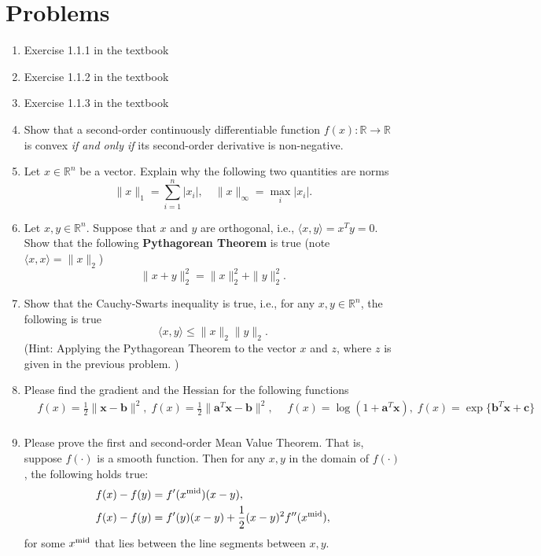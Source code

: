 \documentclass[11pt,letterpaper]{article}
\newcommand{\bb}{\mathbf{b}}
\newcommand{\bx}{\mathbf{x}}
\begin{document}
\section{Problems}

\begin{enumerate}
\item Exercise 1.1.1 in the textbook
\item Exercise 1.1.2 in the textbook
\item Exercise 1.1.3 in the textbook
\item Show that a second-order continuously differentiable function $f(x):\mathbb{R}\to \mathbb{R}$ is convex {\it if and only if} its second-order derivative is non-negative.

	  \item Let $x\in\mathbb{R}^n$ be a vector. Explain why the following two quantities are norms
	  $$\|x\|_1=\sum_{i=1}^{n}|x_i|,\quad \|x\|_{\infty} = \max_{i}|x_i|.$$
	  
	   \item Let $x, y\in\mathbb{R}^n$. Suppose that $x$ and $y$ are orthogonal, i.e., $\langle x, y\rangle = x^T y = 0$. Show that the following {\bf Pythagorean Theorem} is true (note $\langle x, x\rangle = \|x\|_2$)
	   $$\|x+y\|_2^2 = \|x\|_2^2+\|y\|_2^2.$$
	   
	   
	   \item Show that the Cauchy-Swarts inequality is true, i.e., for any $x,y\in\mathbb{R}^n$, the following is true
	   $$\langle x, y\rangle\le \|x\|_2\|y\|_2.$$
	   (Hint: Applying the Pythagorean Theorem to the vector $x$ and $z$, where $z$ is given in the previous problem. )
	   
	  
	    \item Please find the gradient and the Hessian for the following functions
	    \begin{align*}
	    &f(x)= \frac{1}{2}\|\bx-\bb\|^2, \; f(x)=\frac{1}{2}\|\mathbf{a}^T \bx-\bb\|^2, \; \quad f(x)=\log(1+\mathbf{a}^T\bx),\; f(x)= \exp\{\bb^T\bx+\mathbf{c}\}\nonumber\\
	    \end{align*}
	    
	    \item Please prove the first and second-order Mean Value Theorem. That is, suppose $f(\cdot)$ is a smooth function. Then for any $x,y$ in the domain of $f(\cdot)$, the following holds true:
\begin{align*}
&{f(x)-f(y)=f'({x}^{\rm mid})(x-y)}, \\
&{f(x)-f(y)=f'(y)(x-y)+\frac{1}{2}(x-y)^2 f''(x^{\rm mid})},
\end{align*}
for some $x^{\rm mid}$ that lies between the line segments between $x,y$. 
\end{enumerate}
\end{document}
